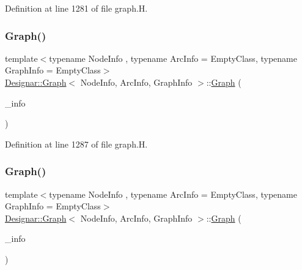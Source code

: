 Definition at line 1281 of file graph.\+H.

\mbox{\label{class_designar_1_1_graph_a61f5be7345295aa375f3a329ded36c17}} 
\subsubsection{\texorpdfstring{Graph()}{Graph()}\hspace{0.1cm}{\footnotesize\ttfamily [2/5]}}
{\footnotesize\ttfamily template$<$typename Node\+Info , typename Arc\+Info  = Empty\+Class, typename Graph\+Info  = Empty\+Class$>$ \\
\hyperlink{class_designar_1_1_graph}{Designar\+::\+Graph}$<$ Node\+Info, Arc\+Info, Graph\+Info $>$\+::\hyperlink{class_designar_1_1_graph}{Graph} (\begin{DoxyParamCaption}\item[{const Graph\+Info \&}]{\+\_\+info }\end{DoxyParamCaption})\hspace{0.3cm}{\ttfamily [inline]}}



Definition at line 1287 of file graph.\+H.

\mbox{\label{class_designar_1_1_graph_a14f42f1511cc6e9edf7f54f656febf1e}} 
\subsubsection{\texorpdfstring{Graph()}{Graph()}\hspace{0.1cm}{\footnotesize\ttfamily [3/5]}}
{\footnotesize\ttfamily template$<$typename Node\+Info , typename Arc\+Info  = Empty\+Class, typename Graph\+Info  = Empty\+Class$>$ \\
\hyperlink{class_designar_1_1_graph}{Designar\+::\+Graph}$<$ Node\+Info, Arc\+Info, Graph\+Info $>$\+::\hyperlink{class_designar_1_1_graph}{Graph} (\begin{DoxyParamCaption}\item[{Graph\+Info \&\&}]{\+\_\+info }\end{DoxyParamCaption})\hspace{0.3cm}{\ttfamily [inline]}}



